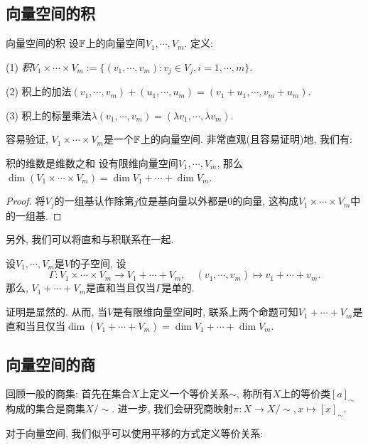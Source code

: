 \subsection{向量空间的积}

\begin{definition}{向量空间的积}
	设$\mathbb{F}$上的向量空间$V_1,\cdots, V_m$. 定义: 
	
	(1) \textit{积}$V_1 \times \cdots \times V_m := \{ (v_1,\cdots ,v_m):v_j \in V_j,i=1,\cdots ,m \}$. 
	
	(2) 积上的加法$(v_1,\cdots ,v_m)+(u_1,\cdots ,u_m) = (v_1+u_1,\cdots ,v_m+u_m)$. 
	
	(3) 积上的标量乘法$\lambda (v_1,\cdots ,v_m) = (\lambda v_1,\cdots ,\lambda v_m)$. 
\end{definition}

容易验证, $V_1 \times \cdots \times V_m$是一个$\mathbb{F}$上的向量空间. 非常直观(且容易证明)地, 我们有: 

\begin{proposition}{积的维数是维数之和}
	设有限维向量空间$V_1,\cdots, V_m$, 那么$\dim (V_1 \times \cdots \times V_m) = \dim V_1 + \cdots + \dim V_m$. 
\end{proposition}
\begin{proof}
	将$V_j$的一组基认作除第$j$位是基向量以外都是$0$的向量, 这构成$V_1 \times \cdots \times V_m$中的一组基. 
\end{proof}

另外, 我们可以将直和与积联系在一起. 

\begin{proposition}{}
	设$V_1,\cdots ,V_m$是$V$的子空间, 设$$\Gamma :V_1\times \cdots \times V_m \to V_1+\cdots +V_m,\quad (v_1,\cdots ,v_m)\mapsto v_1+\cdots +v_m. $$
	那么, $V_1 + \cdots + V_m$是直和当且仅当$\Gamma$是单的. 
\end{proposition}

证明是显然的. 从而, 当$V$是有限维向量空间时, 联系上两个命题可知$V_1+\cdots +V_m$是直和当且仅当$\dim (V_1 + \cdots + V_m) = \dim V_1 + \cdots + \dim V_m$. 

\subsection{向量空间的商}

回顾一般的商集: 首先在集合$X$上定义一个等价关系$\sim$, 称所有$X$上的等价类$[a]_{\sim}$构成的集合是商集$X/\sim$. 进一步, 我们会研究商映射$\pi :X \to X/\sim ,x \mapsto [x]_{\sim}$. 

对于向量空间, 我们似乎可以使用平移的方式定义等价关系: 

